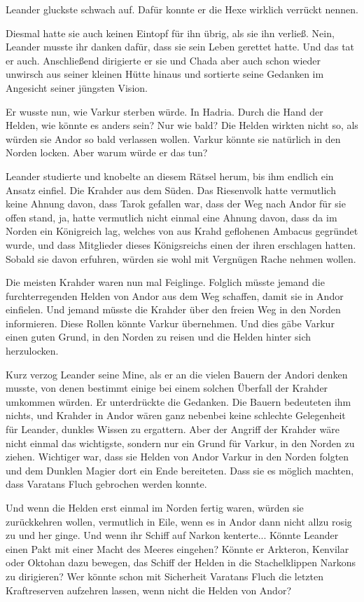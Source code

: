 Leander gluckste schwach auf. Dafür konnte er die Hexe wirklich verrückt nennen.

Diesmal hatte sie auch keinen Eintopf für ihn übrig, als sie ihn verließ. Nein, Leander musste ihr danken dafür, dass sie sein Leben gerettet hatte. Und das tat er auch. Anschließend dirigierte er sie und Chada aber auch schon wieder unwirsch aus seiner kleinen Hütte hinaus und sortierte seine Gedanken im Angesicht seiner jüngsten Vision.

Er wusste nun, wie Varkur sterben würde. In Hadria. Durch die Hand der Helden, wie könnte es anders sein? Nur wie bald? Die Helden wirkten nicht so, als würden sie Andor so bald verlassen wollen. Varkur könnte sie natürlich in den Norden locken. Aber warum würde er das tun?

Leander studierte und knobelte an diesem Rätsel herum, bis ihm endlich ein Ansatz einfiel. Die Krahder aus dem Süden. Das Riesenvolk hatte vermutlich keine Ahnung davon, dass Tarok gefallen war, dass der Weg nach Andor für sie offen stand, ja, hatte vermutlich nicht einmal eine Ahnung davon, dass da im Norden ein Königreich lag, welches von aus Krahd geflohenen Ambacus gegründet wurde, und dass Mitglieder dieses Königsreichs einen der ihren erschlagen hatten. Sobald sie davon erfuhren, würden sie wohl mit Vergnügen Rache nehmen wollen.

Die meisten Krahder waren nun mal Feiglinge. Folglich müsste jemand die furchterregenden Helden von Andor aus dem Weg schaffen, damit sie in Andor einfielen. Und jemand müsste die Krahder über den freien Weg in den Norden informieren. Diese Rollen könnte Varkur übernehmen. Und dies gäbe Varkur einen guten Grund, in den Norden zu reisen und die Helden hinter sich herzulocken.

Kurz verzog Leander seine Mine, als er an die vielen Bauern der Andori denken musste, von denen bestimmt einige bei einem solchen Überfall der Krahder umkommen würden. Er unterdrückte die Gedanken. Die Bauern bedeuteten ihm nichts, und Krahder in Andor wären ganz nebenbei keine schlechte Gelegenheit für Leander, dunkles Wissen zu ergattern. Aber der Angriff der Krahder wäre nicht einmal das wichtigste, sondern nur ein Grund für Varkur, in den Norden zu ziehen. Wichtiger war, dass sie Helden von Andor Varkur in den Norden folgten und dem Dunklen Magier dort ein Ende bereiteten. Dass sie es möglich machten, dass Varatans Fluch gebrochen werden konnte.

Und wenn die Helden erst einmal im Norden fertig waren, würden sie zurückkehren wollen, vermutlich in Eile, wenn es in Andor dann nicht allzu rosig zu und her ginge. Und wenn ihr Schiff auf Narkon kenterte... Könnte Leander einen Pakt mit einer Macht des Meeres eingehen? Könnte er Arkteron, Kenvilar oder Oktohan dazu bewegen, das Schiff der Helden in die Stachelklippen Narkons zu dirigieren? Wer könnte schon mit Sicherheit Varatans Fluch die letzten Kraftreserven aufzehren lassen, wenn nicht die Helden von Andor?

